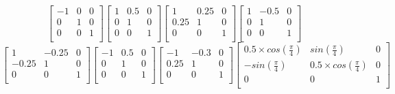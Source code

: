\documentclass{article}
\begin{document}
\begin{equation*}
   \begin{bmatrix} 
   -1 & 0 & 0 \\
    0 & 1 & 0 \\
    0 & 0 & 1  \\
   \end{bmatrix} 
   \begin{bmatrix} 
    1 & 0.5 & 0 \\
    0 & 1 & 0 \\
    0 & 0 & 1  \\
   \end{bmatrix} 
   \begin{bmatrix} 
   1 & 0.25 & 0 \\
    0.25 & 1 & 0 \\
    0 & 0 & 1  \\
   \end{bmatrix} 
   \begin{bmatrix} 
   1 & -0.5 & 0 \\
    0 & 1 & 0 \\
    0 & 0 & 1  \\
   \end{bmatrix} 
\end{equation*}
\begin{equation*}
   \begin{bmatrix} 
   1 & -0.25 & 0 \\
    -0.25 & 1 & 0 \\
    0 & 0 & 1  \\
   \end{bmatrix} 
   \begin{bmatrix} 
   -1 & 0.5 & 0 \\
    0 & 1 & 0 \\
    0 & 0 & 1  \\
   \end{bmatrix} 
   \begin{bmatrix} 
   -1 & -0.3 & 0 \\
    0.25 & 1 & 0 \\
    0 & 0 & 1  \\
   \end{bmatrix} 
   \begin{bmatrix} 
   0.5 \times cos(\frac{\pi}{4}) & sin(\frac{\pi}{4}) & 0 \\
    -sin(\frac{\pi}{4}) & 0.5 \times cos(\frac{\pi}{4}) & 0 \\
    0 & 0 & 1  \\
   \end{bmatrix} 
\end{equation*}
\end{document}
